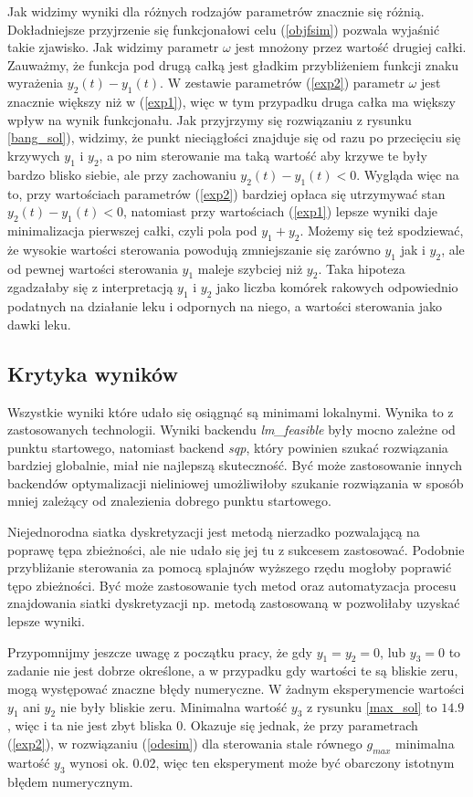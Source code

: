 \documentclass[11pt]{article}
\begin{document}
Jak widzimy wyniki dla różnych rodzajów parametrów znacznie się różnią. Dokładniejsze przyjrzenie się funkcjonałowi celu (\ref{objfsim}) pozwala wyjaśnić takie zjawisko. Jak widzimy parametr $\omega$ jest mnożony przez wartość drugiej całki. Zauważmy, że funkcja pod drugą całką jest gładkim przybliżeniem funkcji znaku wyrażenia $y_2(t) - y_1(t)$. W zestawie parametrów (\ref{exp2}) parametr $\omega$ jest znacznie większy niż w (\ref{exp1}), więc w tym przypadku druga całka ma większy wpływ na wynik funkcjonału. Jak przyjrzymy się rozwiązaniu z rysunku \ref{bang_sol}), widzimy, że punkt nieciągłości znajduje się od razu po przecięciu się krzywych $y_1$ i $y_2$, a po nim sterowanie ma taką wartość aby krzywe te były bardzo blisko siebie, ale przy zachowaniu $y_2(t) - y_1(t) < 0$. Wygląda więc na to, przy wartościach parametrów (\ref{exp2}) bardziej opłaca się utrzymywać stan $y_2(t) - y_1(t) < 0$, natomiast przy wartościach (\ref{exp1}) lepsze wyniki daje minimalizacja pierwszej całki, czyli pola pod $y_1 + y_2$. Możemy się też spodziewać, że wysokie wartości sterowania powodują zmniejszanie się zarówno $y_1$ jak i $y_2$, ale od pewnej wartości sterowania $y_1$ maleje szybciej niż $y_2$. Taka hipoteza zgadzałaby się z interpretacją $y_1$ i $y_2$ jako liczba komórek rakowych odpowiednio podatnych na działanie leku i odpornych na niego, a wartości sterowania jako dawki leku.

\subsection{Krytyka wyników}
Wszystkie wyniki które udało się osiągnąć są minimami lokalnymi. Wynika to z zastosowanych technologii. Wyniki backendu {\it lm\_feasible\/} były mocno zależne od punktu startowego, natomiast backend {\it sqp\/}, który powinien szukać rozwiązania bardziej globalnie, miał nie najlepszą skuteczność. Być może zastosowanie innych backendów optymalizacji nieliniowej umożliwiłoby szukanie rozwiązania w sposób mniej zależący od znalezienia dobrego punktu startowego.

Niejednorodna siatka dyskretyzacji jest metodą nierzadko pozwalającą na poprawę tępa zbieżności, ale nie udało się jej tu z sukcesem zastosować. Podobnie przybliżanie sterowania za pomocą splajnów wyższego rzędu mogłoby poprawić tępo zbieżności. Być może zastosowanie tych metod oraz automatyzacja procesu znajdowania siatki dyskretyzacji np. metodą zastosowaną w \cite{Rao-ph} pozwoliłaby uzyskać lepsze wyniki.

Przypomnijmy jeszcze uwagę z początku pracy, że gdy $y_1 = y_2 = 0$, lub $y_3 = 0$ to zadanie nie jest dobrze określone, a w przypadku gdy wartości te są bliskie zeru, mogą występować znaczne błędy numeryczne. W żadnym eksperymencie wartości $y_1$ ani $y_2$ nie były bliskie zeru. Minimalna wartość $y_3$ z rysunku \ref{max_sol} to $14.9$, więc i ta nie jest zbyt bliska 0. Okazuje się jednak, że przy parametrach (\ref{exp2}), w rozwiązaniu (\ref{odesim}) dla sterowania stale równego $g_{max}$ minimalna wartość $y_3$ wynosi ok. $0.02$, więc ten eksperyment może być obarczony istotnym błędem numerycznym.

\newpage{}
{}

\end{document}
